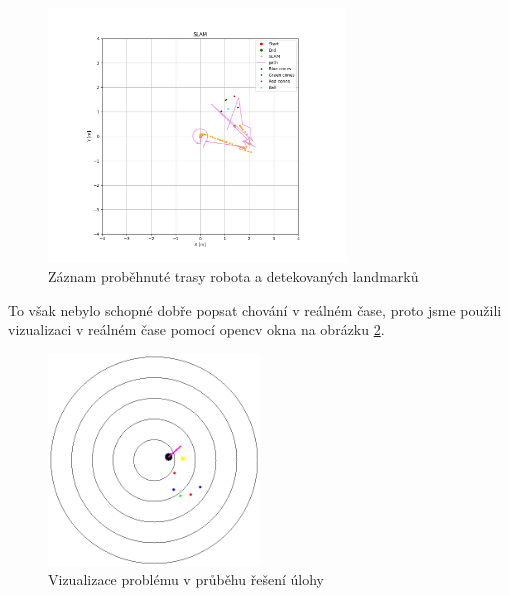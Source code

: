\documentclass[a4paper,12pt]{article}
\begin{document}
\begin{figure}[H]
    \centering
    \includegraphics[width=0.7\textwidth]{pictures/slam3ok.png}
    \caption{Záznam proběhnuté trasy robota a detekovaných landmarků}
    \label{fig:slam_end}
\end{figure}

To však nebylo schopné dobře popsat chování v reálném čase, proto jsme použili vizualizaci v reálném čase pomocí opencv okna na obrázku \ref{fig:slam_in_game}.
\begin{figure}[H]
    \centering
    \includegraphics[width=0.5\textwidth]{pictures/map3.png}
    \caption{Vizualizace problému v průběhu řešení úlohy}
    \label{fig:slam_in_game}
\end{figure}
\end{document}
